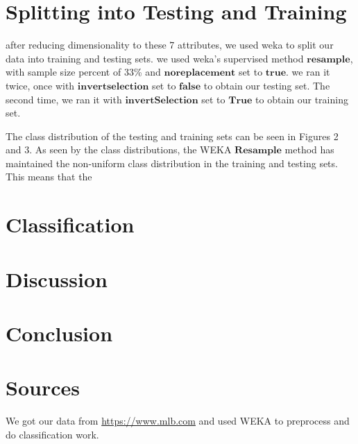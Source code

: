 \documentclass[12pt]{article}
\begin{document}
\section{Splitting into Testing and Training}
after reducing dimensionality to these 7 attributes, we used weka to split our data into training and testing sets. we used weka's supervised method $\textbf{resample}$, with sample size percent of 33\% and $\textbf{noreplacement}$ set to $\textbf{true}$. we ran it twice, once with $\textbf{invertselection}$ set to $\textbf{false}$ to obtain our testing set. 
The second time, we ran it with $\textbf{invertSelection}$ set to $\textbf{True}$ to obtain our training set. 


The class distribution of the testing and training sets can be seen in Figures 2 and 3. As seen by the class distributions, the WEKA $\textbf{Resample}$ method has maintained the non-uniform class distribution in the training and testing sets. This means that the 

\section{Classification}

\section{Discussion}

\section{Conclusion}

\section{Sources}
We got our data from \url{https://www.mlb.com} and used WEKA to preprocess and do classification work. 
\end{document}
